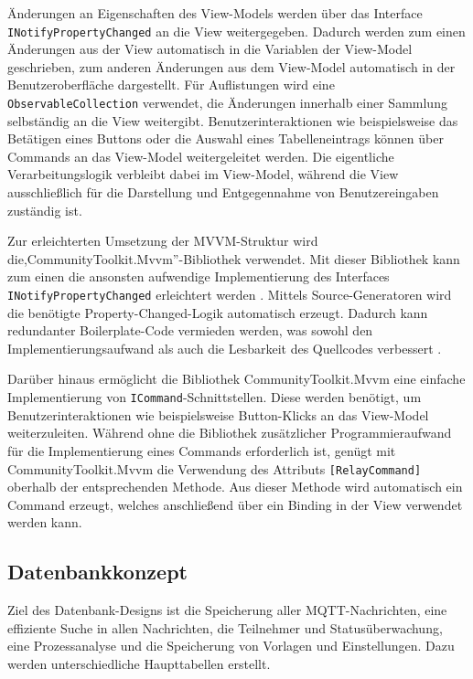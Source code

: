 Änderungen an Eigenschaften des View-Models werden über das Interface \lstinline|INotifyPropertyChanged| an die View weitergegeben. Dadurch werden zum einen Änderungen aus der View automatisch in die Variablen der View-Model geschrieben, zum anderen Änderungen aus dem View-Model automatisch in der Benutzeroberfläche dargestellt. Für Auflistungen wird eine \lstinline|ObservableCollection| verwendet, die Änderungen innerhalb einer Sammlung selbständig an die View weitergibt. Benutzerinteraktionen wie beispielsweise das Betätigen eines Buttons oder die Auswahl eines Tabelleneintrags können über Commands an das View-Model weitergeleitet werden. Die eigentliche Verarbeitungslogik verbleibt dabei im View-Model, während die View ausschließlich für die Darstellung und Entgegennahme von Benutzereingaben zuständig ist. \autocite{michaelstonisModelViewViewModelNET}

Zur erleichterten Umsetzung der MVVM-Struktur wird die,CommunityToolkit.Mvvm''-Bibliothek verwendet. Mit dieser Bibliothek kann zum einen die ansonsten aufwendige Implementierung des Interfaces \lstinline |INotifyPropertyChanged| erleichtert werden \autocite[107--109]{nijsMVVMPatternNET2023a}. Mittels Source-Generatoren wird die benötigte Property-Changed-Logik automatisch erzeugt. Dadurch kann redundanter Boilerplate-Code vermieden werden, was sowohl den Implementierungsaufwand als auch die Lesbarkeit des Quellcodes verbessert \autocite[111 --114]{nijsMVVMPatternNET2023a}.

Darüber hinaus ermöglicht die Bibliothek CommunityToolkit.Mvvm eine einfache Implementierung von \lstinline|ICommand|-Schnittstellen. Diese werden benötigt, um Benutzerinteraktionen wie beispielsweise Button-Klicks an das View-Model weiterzuleiten. Während ohne die Bibliothek zusätzlicher Programmieraufwand für die Implementierung eines Commands erforderlich ist, genügt mit CommunityToolkit.Mvvm die Verwendung des Attributs \lstinline|[RelayCommand]| oberhalb der entsprechenden Methode. Aus dieser Methode wird automatisch ein Command erzeugt, welches anschließend über ein Binding in der View verwendet werden kann. \autocite[109--111]{nijsMVVMPatternNET2023a}

\subsection{Datenbankkonzept}
Ziel des Datenbank-Designs ist die Speicherung aller MQTT-Nachrichten, eine effiziente Suche in allen Nachrichten, die Teilnehmer und Statusüberwachung, eine Prozessanalyse und die Speicherung von Vorlagen und Einstellungen.
Dazu werden unterschiedliche Haupttabellen erstellt.

